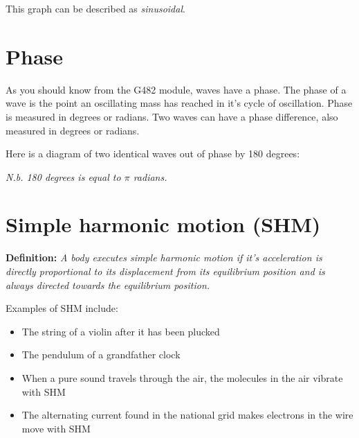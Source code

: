 \documentclass{article}
\begin{document}
This graph can be described as \textit{sinusoidal}.

\section*{Phase}
As you should know from the G482 module, waves have a phase. The phase of a wave
is the point an oscillating mass has reached in it's cycle of oscillation. Phase
is measured in degrees or radians. Two waves can have a phase difference, also
measured in degrees or radians.

Here is a diagram of two identical waves out of phase by 180 degrees:


\textit{N.b. 180 degrees is equal to $\pi$ radians.}

\section*{Simple harmonic motion (SHM)}
\textbf{Definition: }\textit{A body executes simple harmonic motion if it's
acceleration is directly proportional to its displacement from its equilibrium
position and is always directed towards the equilibrium position.}

Examples of SHM include:
\begin{itemize}
	\item The string of a violin after it has been plucked
	\item The pendulum of a grandfather clock
	\item When a pure sound travels through the air, the molecules in the air 
		vibrate with SHM
	\item The alternating current found in the national grid makes electrons in
		the wire move with SHM
\end{itemize}
\end{document}
